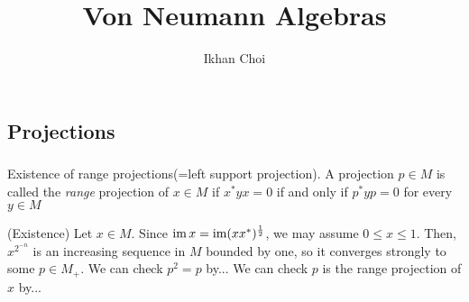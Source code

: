 \documentclass{../../large}
\begin{document}
\title{Von Neumann Algebras}
\author{Ikhan Choi}
\maketitle
\tableofcontents

\iffalse
injectivity
Connes embeddability
Existentially closed II$_1$ factors
property Gamma
Connes' bicentralizer problem
Shlyakhtenko semicircular system
free probability
group stability

Direct integral!
Types!
Traces!

\fi


\part{}


\chapter{Projections}

\section{}
Existence of range projections(=left support projection).
A projection $p\in M$ is called the \emph{range} projection of $x\in M$ if $x^*yx=0$ if and only if $p^*yp=0$ for every $y\in M$
\begin{pf}
(Existence)
Let $x\in M$.
Since $\operatorname{im} x=\operatorname{im}(xx^*)^{\frac12}$, we may assume $0\le x\le1$.
Then, $x^{2^{-n}}$ is an increasing sequence in $M$ bounded by one, so it converges strongly to some $p\in M_+$.
We can check $p^2=p$ by...
We can check $p$ is the range projection of $x$ by...
\end{pf}
\end{document}
